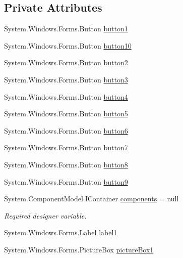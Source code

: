 \subsection*{Private Attributes}
\begin{DoxyCompactItemize}
\item 
System.\+Windows.\+Forms.\+Button \hyperlink{class__7___doroshenko__forms2__is52_1_1_form1_aa89e62121bfbd844d17cec2d92efa369}{button1}
\item 
System.\+Windows.\+Forms.\+Button \hyperlink{class__7___doroshenko__forms2__is52_1_1_form1_a0f41d11a79c850781369ad4532f37cf9}{button10}
\item 
System.\+Windows.\+Forms.\+Button \hyperlink{class__7___doroshenko__forms2__is52_1_1_form1_a7376652113f624f301f0e56ba68850f8}{button2}
\item 
System.\+Windows.\+Forms.\+Button \hyperlink{class__7___doroshenko__forms2__is52_1_1_form1_a0e501999e7626a988e8d8f8d8d355397}{button3}
\item 
System.\+Windows.\+Forms.\+Button \hyperlink{class__7___doroshenko__forms2__is52_1_1_form1_afe0d16f526aff4fbcba56b76c116eef1}{button4}
\item 
System.\+Windows.\+Forms.\+Button \hyperlink{class__7___doroshenko__forms2__is52_1_1_form1_ab8f9fee487c9387d9276e5f7881e0259}{button5}
\item 
System.\+Windows.\+Forms.\+Button \hyperlink{class__7___doroshenko__forms2__is52_1_1_form1_a182bd62837ad295a61a36512c12275e5}{button6}
\item 
System.\+Windows.\+Forms.\+Button \hyperlink{class__7___doroshenko__forms2__is52_1_1_form1_a07fa81a633d56d9dc2e762e69659658f}{button7}
\item 
System.\+Windows.\+Forms.\+Button \hyperlink{class__7___doroshenko__forms2__is52_1_1_form1_a17ac3866e31c197ddb217c00920b43e0}{button8}
\item 
System.\+Windows.\+Forms.\+Button \hyperlink{class__7___doroshenko__forms2__is52_1_1_form1_a9a7934f9b7f1ecce1063994427111b61}{button9}
\item 
System.\+Component\+Model.\+I\+Container \hyperlink{class__7___doroshenko__forms2__is52_1_1_form1_abe30f7b7be7a7b7fd89bdf3064ec2b39}{components} = null
\begin{DoxyCompactList}\small\item\em Required designer variable. \end{DoxyCompactList}\item 
System.\+Windows.\+Forms.\+Label \hyperlink{class__7___doroshenko__forms2__is52_1_1_form1_a10e4148efab88e904c57b32fa0e04442}{label1}
\item 
System.\+Windows.\+Forms.\+Picture\+Box \hyperlink{class__7___doroshenko__forms2__is52_1_1_form1_a933cbf3a176db517c87b626bd610c732}{picture\+Box1}
\end{DoxyCompactItemize}


